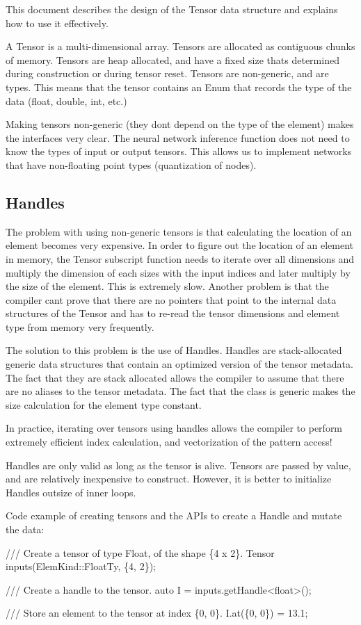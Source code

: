This document describes the design of the Tensor data structure and explains how to use it effectively.

A Tensor is a multi-\/dimensional array. Tensors are allocated as contiguous chunks of memory. Tensors are heap allocated, and have a fixed size that\textquotesingle{}s determined during construction or during tensor reset. Tensors are non-\/generic, and are types. This means that the tensor contains an Enum that records the type of the data (float, double, int, etc.)

Making tensors non-\/generic (they don\textquotesingle{}t depend on the type of the element) makes the interfaces very clear. The neural network inference function does not need to know the types of input or output tensors. This allows us to implement networks that have non-\/floating point types (quantization of nodes).

\subsection*{Handles}

The problem with using non-\/generic tensors is that calculating the location of an element becomes very expensive. In order to figure out the location of an element in memory, the Tensor subscript function needs to iterate over all dimensions and multiply the dimension of each sizes with the input indices and later multiply by the size of the element. This is extremely slow. Another problem is that the compiler can\textquotesingle{}t prove that there are no pointers that point to the internal data structures of the Tensor and has to re-\/read the tensor dimensions and element type from memory very frequently.

The solution to this problem is the use of Handles. Handles are stack-\/allocated generic data structures that contain an optimized version of the tensor metadata. The fact that they are stack allocated allows the compiler to assume that there are no aliases to the tensor metadata. The fact that the class is generic makes the size calculation for the element type constant.

In practice, iterating over tensors using handles allows the compiler to perform extremely efficient index calculation, and vectorization of the pattern access!

Handles are only valid as long as the tensor is alive. Tensors are passed by value, and are relatively inexpensive to construct. However, it is better to initialize Handles outsize of inner loops.

Code example of creating tensors and the A\+P\+Is to create a Handle and mutate the data\+:


\begin{DoxyCode}
/// Create a tensor of type Float, of the shape \{4 x 2\}.
Tensor inputs(ElemKind::FloatTy, \{4, 2\});

/// Create a handle to the tensor.
auto I = inputs.getHandle<float>();

/// Store an element to the tensor at index \{0, 0\}.
I.at(\{0, 0\}) = 13.1;
\end{DoxyCode}
 